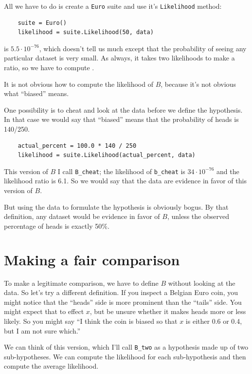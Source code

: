 \documentclass[12pt]{book}
\begin{document}
All we have to do is create a {\tt Euro} suite and use
it's {\tt Likelihood} method:

\begin{verbatim}
    suite = Euro()
    likelihood = suite.Likelihood(50, data)
\end{verbatim}

 is $5.5 \cdot 10^{-76}$, which doesn't tell us much except
that the probability of seeing any particular dataset is very small.
As always, it takes two likelihoods to make a ratio, so we have to
compute .

It is not obvious how to compute the likelihood of $B$, because
it's not obvious what ``biased'' means.

One possibility is to cheat and look at the data before we define
the hypothesis.  In that case we would say that ``biased'' means that
the probability of heads is 140/250.

\begin{verbatim}
    actual_percent = 100.0 * 140 / 250
    likelihood = suite.Likelihood(actual_percent, data)
\end{verbatim}

This version of $B$ I call \verb"B_cheat"; the likelihood of
\verb"b_cheat" is $34 \cdot 10^{-76}$ and the likelihood ratio is
6.1.  So we would say that the data are evidence in favor of this
version of $B$.

But using the data to formulate the hypothesis
is obviously bogus.  By that definition, any dataset would
be evidence in favor of $B$, unless the observed percentage of heads
is exactly 50\%.

\section{Making a fair comparison}

To make a legitimate comparison, we have to define $B$ without looking
at the data.  So let's try a different definition.  If you inspect
a Belgian Euro coin, you might notice that the ``heads'' side is more
prominent than the ``tails'' side.  You might expect that to effect
$x$, but be unsure whether it makes heads more or less
likely.  So you might say ``I think the coin is biased so that
$x$ is either 0.6 or 0.4, but I am not sure which.''

We can think of this version, which I'll call \verb"B_two"
as a hypothesis made up of two
sub-hypotheses.  We can compute the likelihood for each
sub-hypothesis and then compute the average likelihood.
\end{document}

